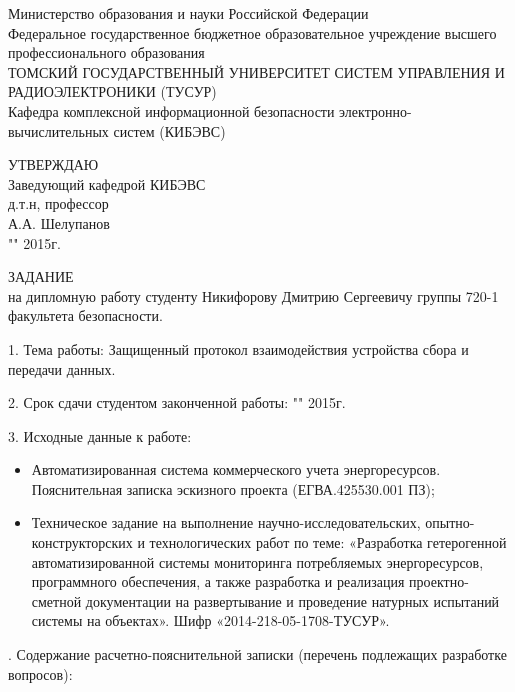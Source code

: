 \newpage
{}

\begin{center}
Министерство образования и науки Российской Федерации\\
Федеральное государственное бюджетное образовательное учреждение высшего профессионального образования\\
ТОМСКИЙ ГОСУДАРСТВЕННЫЙ УНИВЕРСИТЕТ СИСТЕМ УПРАВЛЕНИЯ И РАДИОЭЛЕКТРОНИКИ (ТУСУР)\\
Кафедра комплексной информационной безопасности электронно-вычислительных систем (КИБЭВС)\\
\end{center}

\hfill
\begin{minipage}[right]{0.4\linewidth}
\begin{singlespace}
 УТВЕРЖДАЮ \\
 Заведующий кафедрой КИБЭВС \\
 д.т.н, профессор \\
 \underline{\hspace{2.5cm}}А.А. Шелупанов \\
 "\underline{\hspace{1cm}}"\underline{\hspace{3cm}} 2015г.\\
\end{singlespace} 
\end{minipage}

\vspace{1cm}

\hfill ЗАДАНИЕ \hfill \\
на дипломную работу студенту Никифорову Дмитрию Сергеевичу группы 720-1 факультета безопасности.

1. Тема работы: Защищенный протокол взаимодействия устройства сбора и передачи данных.

2. Срок сдачи студентом законченной работы: "\underline{\hspace{1cm}}"\underline{\hspace{3cm}} 2015г.

3. Исходные данные к работе:

\begin{itemize}
 \item Автоматизированная система коммерческого учета энергоресурсов. Пояснительная записка эскизного проекта (ЕГВА.425530.001 ПЗ);
 \item Техническое задание на выполнение научно-исследовательских, опытно-конструкторских и технологических работ по теме: «Разработка гетерогенной автоматизированной системы мониторинга потребляемых энергоресурсов, программного обеспечения, а также разработка и реализация проектно-сметной документации на развертывание и проведение натурных испытаний системы на объектах». Шифр «2014-218-05-1708-ТУСУР».
\end{itemize}
. Содержание расчетно-пояснительной записки (перечень подлежащих разработке вопросов):

